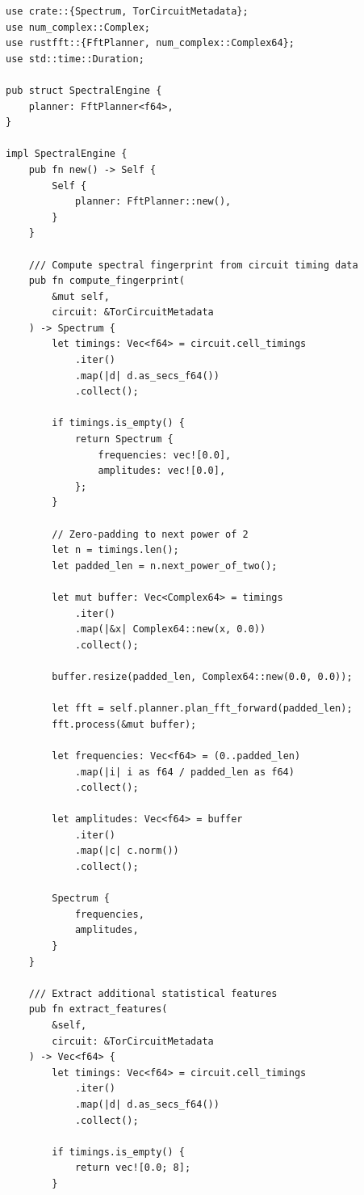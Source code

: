 \documentclass[11pt,a4paper]{article}
\begin{document}
\begin{lstlisting}[style=rust]
use crate::{Spectrum, TorCircuitMetadata};
use num_complex::Complex;
use rustfft::{FftPlanner, num_complex::Complex64};
use std::time::Duration;

pub struct SpectralEngine {
    planner: FftPlanner<f64>,
}

impl SpectralEngine {
    pub fn new() -> Self {
        Self {
            planner: FftPlanner::new(),
        }
    }
    
    /// Compute spectral fingerprint from circuit timing data
    pub fn compute_fingerprint(
        &mut self, 
        circuit: &TorCircuitMetadata
    ) -> Spectrum {
        let timings: Vec<f64> = circuit.cell_timings
            .iter()
            .map(|d| d.as_secs_f64())
            .collect();
        
        if timings.is_empty() {
            return Spectrum {
                frequencies: vec![0.0],
                amplitudes: vec![0.0],
            };
        }
        
        // Zero-padding to next power of 2
        let n = timings.len();
        let padded_len = n.next_power_of_two();
        
        let mut buffer: Vec<Complex64> = timings
            .iter()
            .map(|&x| Complex64::new(x, 0.0))
            .collect();
        
        buffer.resize(padded_len, Complex64::new(0.0, 0.0));
        
        let fft = self.planner.plan_fft_forward(padded_len);
        fft.process(&mut buffer);
        
        let frequencies: Vec<f64> = (0..padded_len)
            .map(|i| i as f64 / padded_len as f64)
            .collect();
        
        let amplitudes: Vec<f64> = buffer
            .iter()
            .map(|c| c.norm())
            .collect();
        
        Spectrum {
            frequencies,
            amplitudes,
        }
    }
    
    /// Extract additional statistical features
    pub fn extract_features(
        &self, 
        circuit: &TorCircuitMetadata
    ) -> Vec<f64> {
        let timings: Vec<f64> = circuit.cell_timings
            .iter()
            .map(|d| d.as_secs_f64())
            .collect();
        
        if timings.is_empty() {
            return vec![0.0; 8];
        }
        

\end{lstlisting}
\end{document}
